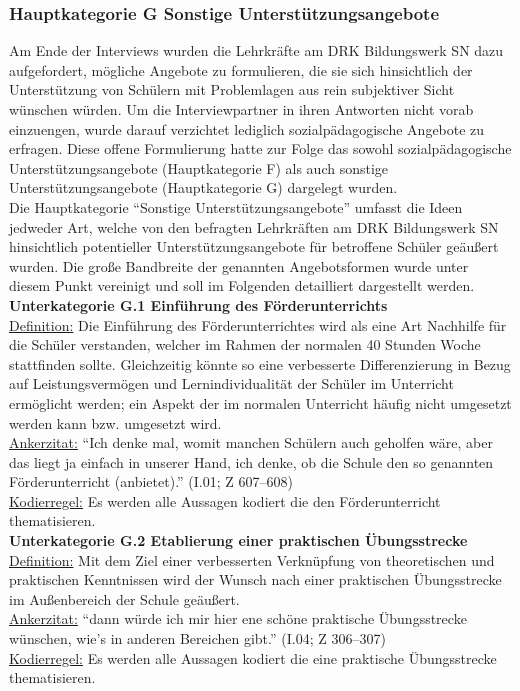 \subsubsection{Hauptkategorie G Sonstige Unterstützungsangebote}
\label{sec:HauptkategorieGSonstigeUnterstützungsangebote}

Am Ende der Interviews wurden die Lehrkräfte am DRK Bildungswerk SN dazu aufgefordert, mögliche Angebote zu formulieren, die sie sich hinsichtlich der Unterstützung von Schülern mit Problemlagen aus rein subjektiver Sicht wünschen würden. Um die Interviewpartner in ihren Antworten nicht vorab einzuengen, wurde darauf verzichtet lediglich sozialpädagogische Angebote zu erfragen. Diese offene Formulierung hatte zur Folge das sowohl sozialpädagogische Unterstützungsangebote (Hauptkategorie F) als auch sonstige Unterstützungsangebote (Hauptkategorie G) dargelegt wurden.\\
Die Hauptkategorie "`Sonstige Unterstützungsangebote"' umfasst die Ideen jedweder Art, welche von den befragten Lehrkräften am DRK Bildungswerk SN hinsichtlich potentieller Unterstützungsangebote für betroffene Schüler geäußert wurden. Die große Bandbreite der genannten Angebotsformen wurde unter diesem Punkt vereinigt und soll im Folgenden detailliert dargestellt werden.\\

\textbf{Unterkategorie G.1 Einführung des Förderunterrichts}\\
\underline{Definition:} Die Einführung des Förderunterrichtes wird als eine Art Nachhilfe für die Schüler verstanden, welcher im Rahmen der normalen 40 Stunden Woche stattfinden sollte. Gleichzeitig könnte so eine verbesserte Differenzierung in Bezug auf Leistungsvermögen und Lernindividualität der Schüler im Unterricht ermöglicht werden; ein Aspekt der im normalen Unterricht häufig nicht umgesetzt werden kann bzw. umgesetzt wird.\\
\underline{Ankerzitat:} "`Ich denke mal, womit manchen Schülern auch geholfen wäre, aber das liegt ja einfach in unserer Hand, ich denke, ob die Schule den so genannten Förderunterricht (anbietet)."' (I.01; Z 607--608)\\
\underline{Kodierregel:} Es werden alle Aussagen kodiert die den Förderunterricht thematisieren.\\

\textbf{Unterkategorie G.2 Etablierung einer praktischen Übungsstrecke}\\
\underline{Definition:} Mit dem Ziel einer verbesserten Verknüpfung von theoretischen und praktischen Kenntnissen wird der Wunsch nach einer praktischen Übungsstrecke im Außenbereich der Schule geäußert.\\
\underline{Ankerzitat:} "`dann würde ich mir hier ene schöne praktische Übungsstrecke wünschen, wie's in anderen Bereichen gibt."' (I.04; Z 306--307)\\
\underline{Kodierregel:} Es werden alle Aussagen kodiert die eine praktische Übungsstrecke thematisieren.\\

